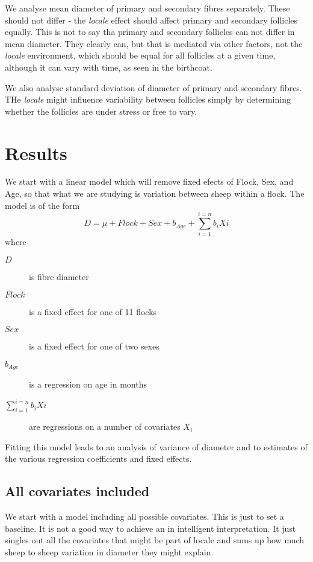 \documentclass[titlepage]{article}  %
\begin{document}
We analyse mean diameter of primary and secondary fibres separately. These should not differ - the {\em locale} effect should affect primary and secondary follicles equally. This is not to say tha primary and secondary follicles can not differ in mean diameter.  They clearly can,  but that is mediated via other factors, not the {\em locale} environment, which should be equal for all follicles at a given time, although it can vary with time, as seen in the birthcoat. 

We also analyse standard deviation of diameter of primary and secondary fibres. THe {\em locale} might influence variability between follicles simply by determining whether the follicles are under stress or free to vary.


\section{Results}
We start with a linear model which will remove fixed efects of Flock, Sex, and Age, so that what we are studying is variation between sheep within a flock. The model is of the form
\begin{equation}
\label{eqn:fullmod}
D = \mu + Flock + Sex + b_{Age} + \sum_{i=1}^{i=n} b_{i}X{i}
\end{equation}
where
\begin{description}
\item[$D$] is fibre diameter
\item[$Flock$] is a fixed effect for one of 11 flocks
\item[$Sex$] is a fixed effect for one of two sexes
\item[$b_{Age}$] is a regression on age in months 
\item[$\sum_{i=1}^{i=n} b_{i}X{i}$] are regressions on a number of covariates $X_{i}$
\end{description}

Fitting this model leads to an analysis of variance of diameter and to estimates of the various regression coefficients and fixed effects.

\subsection{All covariates included}
We start with a model including all possible covariates.  This is just to set a baseline. It is not a good way to achieve an in intelligent interpretation. It just singles out all the covariates that might be part of locale and sums up how much sheep to sheep variation in diameter they might explain.
\end{document}
